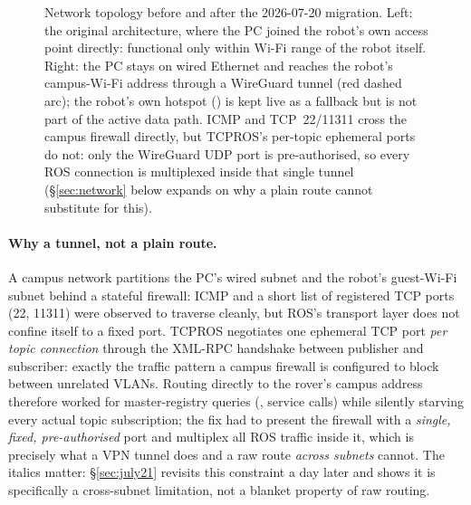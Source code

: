 \begin{figure}[htbp]
{}
\caption{Network topology before and after the 2026-07-20 migration. Left:
the original architecture, where the PC joined the robot's own access point
directly: functional only within Wi-Fi range of the robot itself. Right:
the PC stays on wired Ethernet and reaches the robot's campus-Wi-Fi address
through a WireGuard tunnel (red dashed arc); the robot's own hotspot
() is kept live as a fallback but is not part of the active
data path. ICMP and TCP~22/11311 cross the campus firewall directly, but
TCPROS's per-topic ephemeral ports do not: only the WireGuard UDP port is
pre-authorised, so every ROS connection is multiplexed inside that single
tunnel (\S\ref{sec:network} below expands on why a plain route cannot
substitute for this).}
\label{fig:network-before-after}
\end{figure}

\paragraph{Why a tunnel, not a plain route.} A campus network partitions the
PC's wired subnet and the robot's guest-Wi-Fi subnet behind a stateful
firewall: ICMP and a short list of registered TCP ports (22, 11311) were
observed to traverse cleanly, but ROS's transport layer does not confine
itself to a fixed port. TCPROS negotiates one ephemeral TCP port \emph{per
topic connection} through the XML-RPC handshake between publisher and
subscriber: exactly the traffic pattern a campus firewall is configured
to block between unrelated VLANs. Routing directly to the rover's campus
address therefore worked for master-registry queries (,
service calls) while silently starving every actual topic subscription; the
fix had to present the firewall with a \emph{single, fixed, pre-authorised}
port and multiplex all ROS traffic inside it, which is precisely what a VPN
tunnel does and a raw route \emph{across subnets} cannot. The italics matter:
\S\ref{sec:july21} revisits this constraint a day later and shows it is
specifically a cross-subnet limitation, not a blanket property of raw
routing.

